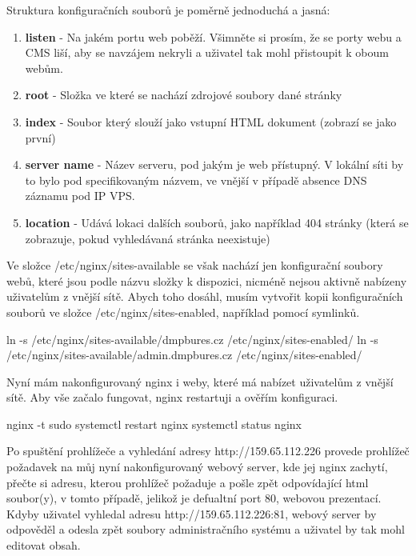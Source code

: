 \documentclass[12pt,a4paper]{report}
\begin{document}
  Struktura konfiguračních souborů je poměrně jednoduchá a jasná: 
  \begin{enumerate}
    \item \textbf{listen} - Na jakém portu web poběží. Všimněte si prosím, že se porty webu a CMS liší, aby se navzájem nekryli a uživatel tak mohl přistoupit k oboum webům.
    \item \textbf{root} - Složka ve které se nachází zdrojové soubory dané stránky
    \item \textbf{index} - Soubor který slouží jako vstupní HTML dokument (zobrazí se jako první)
    \item \textbf{server name} - Název serveru, pod jakým je web přístupný. V lokální síti by to bylo pod specifikovaným názvem, ve vnější v případě absence DNS záznamu pod IP VPS.
    \item \textbf{location} - Udává lokaci dalších souborů, jako například 404 stránky (která se zobrazuje, pokud vyhledávaná stránka neexistuje)
  \end{enumerate}

  Ve složce /etc/nginx/sites-available se však nachází jen konfigurační soubory webů,
  které jsou podle názvu složky k dispozici, nicméně nejsou aktivně nabízeny uživatelům z vnější sítě. 
  Abych toho dosáhl, musím vytvořit kopii konfiguračních souborů ve složce /etc/nginx/sites-enabled, například pomocí symlinků.

  \begin{bash}
    ln -s /etc/nginx/sites-available/dmpbures.cz 
    /etc/nginx/sites-enabled/
    ln -s /etc/nginx/sites-available/admin.dmpbures.cz
     /etc/nginx/sites-enabled/
  \end{bash}

  Nyní mám nakonfigurovaný nginx i weby, které má nabízet uživatelům z vnější sítě.
  Aby vše začalo fungovat, nginx restartuji a ověřím konfiguraci.
  \begin{bash}
    nginx -t
    sudo systemctl restart nginx
    systemctl status nginx
  \end{bash}

  Po spuštění prohlížeče a vyhledání adresy http://159.65.112.226 provede prohlížeč
  požadavek na můj nyní nakonfigurovaný webový server, kde jej nginx zachytí, přečte si adresu, kterou prohlížeč požaduje a 
  pošle zpět odpovídající html soubor(y), v tomto případě, jelikož je defualtní port 80, webovou prezentací.
  Kdyby uživatel vyhledal adresu http://159.65.112.226:81, webový server by odpověděl a odesla zpět soubory administračního systému a uživatel by tak mohl editovat 
  obsah.
\end{document}
